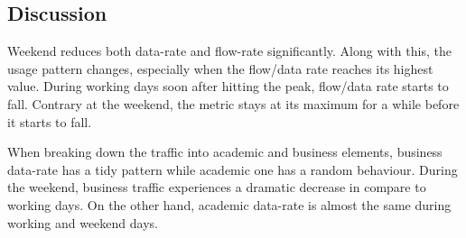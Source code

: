 \documentclass[10pt, journal, letterpaper]{IEEEtran}
\begin{document}
\begin{table}[h!]
	\caption{Rank of Top ASes Generating (Gen.) or Receiving (Rec.) \textbf{flow} during Working Days (WD) and WeekEnd days (WE).}
	\label{tab:OWD_OWE_ASRank_fps}
	\centering
\end{table}

\subsection{Discussion}
Weekend reduces both data-rate and flow-rate significantly. Along with this, the usage pattern changes, especially when the flow/data rate reaches its highest value. During working days soon after hitting the peak, flow/data rate starts to fall. Contrary at the weekend, the metric stays at its maximum for a while before it starts to fall.

When breaking down the traffic into academic and business elements, business data-rate has a tidy pattern while academic one has a random behaviour. During the weekend, business traffic experiences a dramatic decrease in compare to working days. On the other hand, academic data-rate is almost the same during working and weekend days. 
\end{document}
